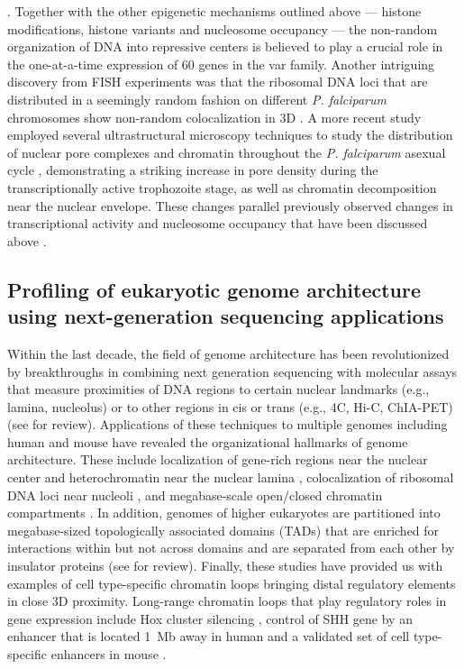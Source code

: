 \citep{lopez-rubio:genome-wide, freitas-junior:frequent, ralph:antigenic}.
Together with the other epigenetic mechanisms outlined above —
histone modifications, histone variants and nucleosome occupancy — the
non-random organization of DNA into repressive centers is believed to play a
crucial role in the one-at-a-time expression of 60 genes in the var family.
Another intriguing discovery from FISH experiments was that the ribosomal DNA
loci that are distributed in a seemingly random fashion on different \textit{P.
falciparum} chromosomes show non-random colocalization in 3D
\citep{mancio-silva:clustering}. A more
recent study employed several ultrastructural microscopy techniques to study
the distribution of nuclear pore complexes and chromatin throughout the
\textit{P.
falciparum} asexual cycle \citep{weiner:3d}, demonstrating a striking increase in pore
density during the transcriptionally active trophozoite stage, as well as
chromatin decomposition near the nuclear envelope. These changes parallel
previously observed changes in transcriptional activity and nucleosome
occupancy that have been discussed above \citep{ponts:nucleosome}.

\subsection{Profiling of eukaryotic genome architecture using next-generation
sequencing applications}

Within the last decade, the field of genome architecture has been
revolutionized by breakthroughs in combining next generation sequencing with
molecular assays that measure proximities of DNA regions to certain nuclear
landmarks (e.g., lamina, nucleolus) or to other regions in cis or trans (e.g.,
4C, Hi-C, ChIA-PET) \citep{duan:three-dimensional,
lieberman-aiden:comprehensive, fullwood:oestrogen-receptor-alpha-bound,
guelen:domain, koningsbruggen:high-resolution, vogel:detection,
zhao:circular} (see \citep{steensel:genomics} for review).
Applications of these
techniques to multiple genomes including human and mouse have revealed the
organizational hallmarks of genome architecture. These include localization of
gene-rich regions near the nuclear center and heterochromatin near the nuclear
lamina \citep{guelen:domain}, colocalization of ribosomal DNA loci near
nucleoli \citep{koningsbruggen:high-resolution}, and
megabase-scale open/closed chromatin compartments
\citep{lieberman-aiden:comprehensive}. In addition, genomes
of higher eukaryotes are partitioned into megabase-sized topologically
associated domains (TADs) that are enriched for interactions within but not
across domains and are separated from each other by insulator proteins
\citep{dixon:topological, nora:spatial, sofueva:cohesin-mediated}
(see \citep{nora:segmental} 
for review). Finally, these studies have provided us with
examples of cell type-specific chromatin loops bringing distal regulatory
elements in close 3D proximity. Long-range chromatin loops that play
regulatory roles in gene expression include Hox cluster silencing
\citep{ferraiuolo:three-dimensional, rousseau:hox},
control of SHH gene by an enhancer that is located 1~Mb away in human
\citep{li:extensive} and
a validated set of cell type-specific enhancers in mouse \citep{shen:map}.

